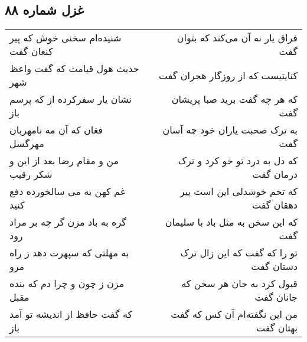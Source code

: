 \begin{center}
\section*{غزل شماره ۸۸}
\label{sec:sh088}
\begin{longtable}{l p{0.5cm} r}
شنیده‌ام سخنی خوش که پیر کنعان گفت
&&
فراق یار نه آن می‌کند که بتوان گفت
\\
حدیث هول قیامت که گفت واعظ شهر
&&
کنایتیست که از روزگار هجران گفت
\\
نشان یار سفرکرده از که پرسم باز
&&
که هر چه گفت برید صبا پریشان گفت
\\
فغان که آن مه نامهربان مهرگسل
&&
به ترک صحبت یاران خود چه آسان گفت
\\
من و مقام رضا بعد از این و شکر رقیب
&&
که دل به درد تو خو کرد و ترک درمان گفت
\\
غم کهن به می سالخورده دفع کنید
&&
که تخم خوشدلی این است پیر دهقان گفت
\\
گره به باد مزن گر چه بر مراد رود
&&
که این سخن به مثل باد با سلیمان گفت
\\
به مهلتی که سپهرت دهد ز راه مرو
&&
تو را که گفت که این زال ترک دستان گفت
\\
مزن ز چون و چرا دم که بنده مقبل
&&
قبول کرد به جان هر سخن که جانان گفت
\\
که گفت حافظ از اندیشه تو آمد باز
&&
من این نگفته‌ام آن کس که گفت بهتان گفت
\\
\end{longtable}
\end{center}
